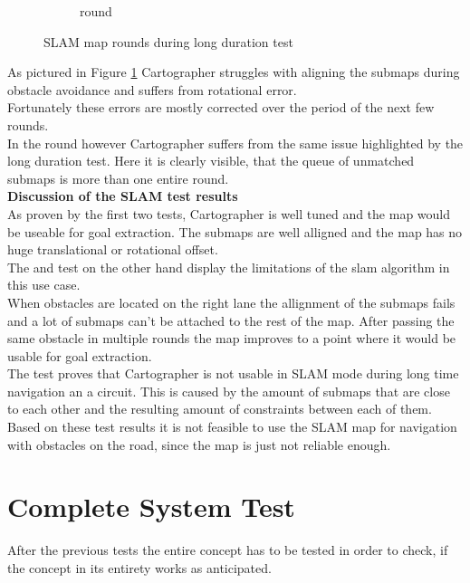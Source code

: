 \begin{figure}
\begin{subfigure}{.3\linewidth}
		\caption{ round}
	\end{subfigure}

	\caption{SLAM map rounds during long duration test}
	\label{4slamtest}

\end{figure}

As pictured in Figure \ref{4slamtest} Cartographer struggles with aligning the submaps during obstacle avoidance and suffers from rotational error.\\
Fortunately these errors are mostly corrected over the period of the next few rounds.\\ In the  round however Cartographer suffers from the same issue highlighted by the long duration test. Here it is clearly visible, that the queue of unmatched submaps is more than one entire round.\\

\textbf{Discussion of the SLAM test results}\\
As proven by the first two tests, Cartographer is well tuned and the map would be useable for goal extraction. The submaps are well alligned and the map has no huge translational or rotational offset.\\

The  and  test on the other hand display the limitations of the slam algorithm in this use case.\\
When obstacles are located on the right lane the allignment of the submaps fails and a lot of submaps can't be attached to the rest of the map. After passing the same obstacle in multiple rounds the map improves to a point where it would be usable for goal extraction.\\
The  test proves that Cartographer is not usable in SLAM mode during long time navigation an a circuit. This is caused by the amount of submaps that are close to each other and the resulting amount of constraints between each of them.\\

Based on these test results it is not feasible to use the SLAM map for navigation with obstacles on the road, since the map is just not reliable enough.




\section{Complete System Test}

After the previous tests the entire concept has to be tested in order to check, if the concept in its entirety works as anticipated.

